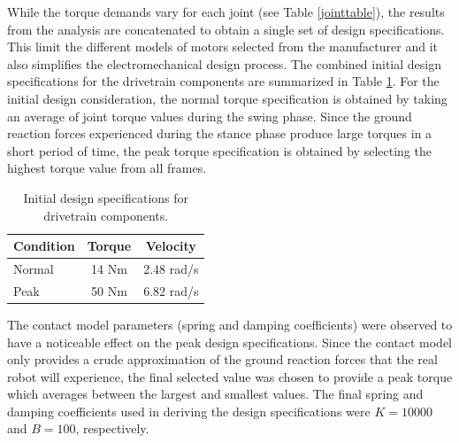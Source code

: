 While the torque demands vary for each joint (see Table \ref{jointtable}), the results from the analysis are concatenated to obtain a single set of design specifications. This limit the different models of motors selected from the manufacturer and it also simplifies the electromechanical design process. The combined initial design specifications for the drivetrain components are summarized in Table \ref{tab:spectable}. For the initial design consideration, the normal torque specification is obtained by taking an average of joint torque values during the swing phase. Since the ground reaction forces experienced during the stance phase produce large torques in a short period of time, the peak torque specification is obtained by selecting the highest torque value from all frames. 

\begin{table}[!h]
  \centering
  \caption{Initial design specifications for drivetrain components.}
    \begin{tabular}{lcc}
    \addlinespace
    \toprule
    \textbf{Condition} & \textbf{Torque} & \textbf{Velocity}\\
    \midrule
    Normal & 14 Nm & 2.48 rad/s\\
    Peak  & 50 Nm & 6.82 rad/s \\
    \bottomrule
    \end{tabular}%
  \label{tab:spectable}%
\end{table}%

The contact model parameters (spring and damping coefficients) were observed to have a noticeable effect on the peak design specifications. Since the contact model only provides a crude approximation of the ground reaction forces that the real robot will experience, the final selected value was chosen to provide a peak torque which averages between the largest and smallest values. The final spring and damping coefficients used in deriving the design specifications were $K = 10000$ and $B = 100$, respectively.





